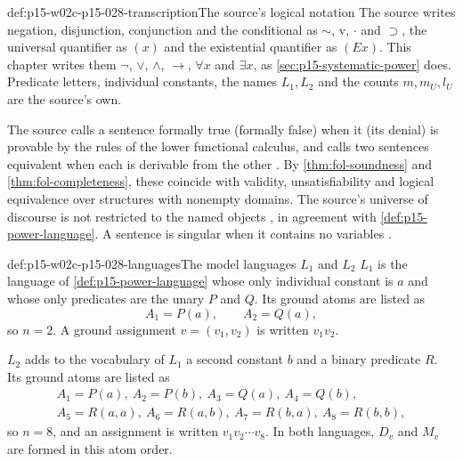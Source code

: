 \begin{hbconvention}{def:p15-w02c-p15-028-transcription}{The source's logical notation}
The source writes negation, disjunction, conjunction and the
conditional as \(\sim\), \(\mathrm v\), \(\cdot\) and \(\supset\), the
universal quantifier as \((x)\) and the existential quantifier as
\((Ex)\). This chapter writes them \(\neg\), \(\lor\), \(\land\),
\(\to\), \(\forall x\) and \(\exists x\), as
\cref{sec:p15-systematic-power} does. Predicate letters, individual
constants, the names \(L_1,L_2\) and the counts \(m,m_U,l_U\) are the
source's own.

The source calls a sentence formally true (formally false) when it
(its denial) is provable by the rules of the lower functional calculus,
and calls two sentences equivalent when each is derivable from the
other \cite[p.~158, (7.1a)]{HempelOppenheim1948Explanation}. By
\cref{thm:fol-soundness} and \cref{thm:fol-completeness},
these coincide with validity, unsatisfiability and logical equivalence
over structures with nonempty domains. The source's universe of
discourse is not restricted to the named objects
\cite[p.~158, (7.2b)]{HempelOppenheim1948Explanation}, in agreement
with \cref{def:p15-power-language}. A sentence is singular when it
contains no variables \cite[p.~158, (7.1b)]{HempelOppenheim1948Explanation}.
\end{hbconvention}

\begin{hbdefinition}{def:p15-w02c-p15-028-languages}{The model languages \(L_1\) and \(L_2\)}
\(L_1\) is the language of \cref{def:p15-power-language} whose only
individual constant is \(a\) and whose only predicates are the unary
\(P\) and \(Q\). Its ground atoms are listed as
\[
 A_1=P(a),\qquad A_2=Q(a),
\]
so \(n=2\). A ground assignment \(v=(v_1,v_2)\) is written \(v_1v_2\).

\(L_2\) adds to the vocabulary of \(L_1\) a second constant \(b\) and a
binary predicate \(R\). Its ground atoms are listed as
\[
\begin{gathered}
 A_1=P(a),\ A_2=P(b),\ A_3=Q(a),\ A_4=Q(b),\\
 A_5=R(a,a),\ A_6=R(a,b),\ A_7=R(b,a),\ A_8=R(b,b),
\end{gathered}
\]
so \(n=8\), and an assignment is written \(v_1v_2\cdots v_8\).
In both languages, \(D_v\) and \(M_v\) are formed in this atom order.
\end{hbdefinition}

